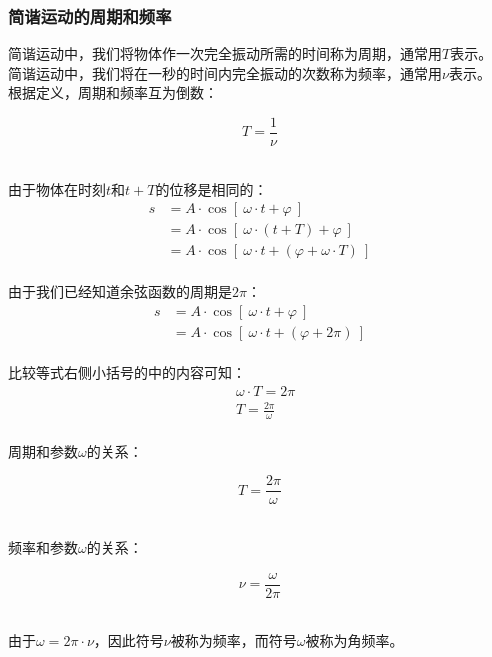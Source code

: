 \documentclass[UTF8]{ctexart}
\begin{document}
\newpage

\subsubsection{简谐运动的周期和频率}
    简谐运动中，我们将物体作一次完全振动所需的时间称为周期，通常用$T$表示。\\[2mm]
    简谐运动中，我们将在一秒的时间内完全振动的次数称为频率，通常用$\nu$表示。\\[3mm]
    根据定义，周期和频率互为倒数：
    \begin{large}
        \begin{equation*}
            T=\frac{1}{\nu}
        \end{equation*}
    \end{large}\\
    由于物体在时刻$t$和$t+T$的位移是相同的：\vspace{3pt}
    \setcounter{equation}{0}
    \begin{align}
        s
        &=A\cdot\cos{[~\omega\cdot t+\varphi~]}\\[3mm]
        &=A\cdot\cos{[~\omega\cdot(t+T)+\varphi~]}\\[3mm]
        &=A\cdot\cos{[~\omega\cdot t+(\varphi+\omega\cdot T)~]}
    \end{align}\\
    由于我们已经知道余弦函数的周期是$2\pi$：\vspace{5pt}
    \begin{align}
        s
        &=A\cdot\cos{[~\omega\cdot t+\varphi~]}\\[3mm]
        &=A\cdot\cos{[~\omega\cdot t+(\varphi+2\pi)~]}
    \end{align}\\
    比较等式右侧小括号的中的内容可知：
    \begin{align}
        &\omega\cdot T=2\pi\\[3mm]
        &T=\frac{2\pi}{\omega}
    \end{align}\\
    周期和参数$\omega$的关系：
    \begin{large}
        \begin{equation*}
            T=\frac{2\pi}{\omega}
        \end{equation*}
    \end{large}\\
    频率和参数$\omega$的关系：
    \begin{large}
        \begin{equation*}
            \nu=\frac{\omega}{2\pi}
        \end{equation*}
    \end{large}\\[1mm]
    由于$\omega=2\pi\cdot\nu$，因此符号$\nu$被称为频率，而符号$\omega$被称为角频率。
\end{document}
